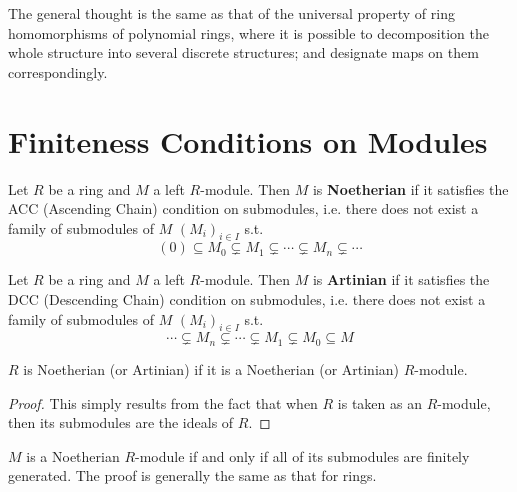 \documentclass{article}
\begin{document}
\begin{remark}
    The general thought is the same as that of the universal property of ring homomorphisms of polynomial rings, where it is possible to decomposition the whole structure into several discrete structures; and designate maps on them correspondingly.
\end{remark}

\section{Finiteness Conditions on Modules}

\begin{definition}
    Let $R$ be a ring and $M$ a left $R$-module. Then $M$ is \textbf{Noetherian} if it satisfies the ACC (Ascending Chain) condition on submodules, i.e. there does not exist a family of submodules of $M$ $(M_i)_{i\in I}$ s.t. 
    \[
        (0)\subseteq M_0 \subsetneq M_1 \subsetneq \cdots \subsetneq M_n \subsetneq \cdots
    \]    
\end{definition}
    
\begin{definition}
    Let $R$ be a ring and $M$ a left $R$-module. Then $M$ is \textbf{Artinian} if it satisfies the DCC (Descending Chain) condition on submodules, i.e. there does not exist a family of submodules of $M$ $(M_i)_{i\in I}$ s.t.
    \[
        \cdots \subsetneq M_n \subsetneq \cdots \subsetneq M_1 \subsetneq M_0 \subseteq M
    \]
\end{definition}

\begin{remark}
    $R$ is Noetherian (or Artinian) if it is a Noetherian (or Artinian) $R$-module. 
\end{remark}

\begin{proof}
    This simply results from the fact that when $R$ is taken as an $R$-module, then its submodules are the ideals of $R$. 
\end{proof}

\begin{remark}
    $M$ is a Noetherian $R$-module if and only if all of its submodules are finitely generated. The proof is generally the same as that for rings.
\end{remark}
\end{document}
